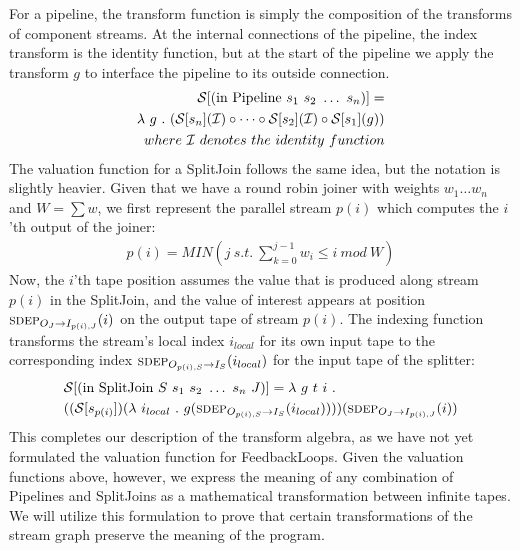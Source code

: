 For a pipeline, the transform function is simply the composition of the
transforms of component streams.  At the internal connections of the
pipeline, the index transform is the identity function, but at the start
of the pipeline we apply the transform $g$ to interface the pipeline to
its outside connection.
\begin{align*}
{\cal S} [(\mbox{in~Pipeline}~s_1~s_2~\dots~s_n)] = \\
\la~g~.~({\cal S}[s_n]({\cal I}) \circ \dots \circ {\cal S}[s_2]({\cal I}) \circ {\cal S}[s_1](g)) \\
where~{\cal I}~denotes~the~identity~function
\end{align*}
The valuation function for a SplitJoin follows the same idea, but the
notation is slightly heavier.  Given that we have a round robin joiner
with weights $w_1 \dots w_n$ and $W = \sum{w}$, we first represent the
parallel stream $p(i)$ which computes the $i$'th output of the
joiner:
\begin{align}
\label{eq:p}
p(i) = MIN(j~s.t.~\sum_{k=0}^{j-1}{w_i} \le i~mod~W)
\end{align}
Now, the $i$'th tape position assumes the value that is produced along
stream $p(i)$ in the SplitJoin, and the value of interest appears at
position $\mi{I_{p(i),J}}{O_J}(i)$ on the output tape of stream $p(i)$.
The indexing function transforms the stream's local index $i_{local}$
for its own input tape to the corresponding index
$\mi{I_S}{O_{p(i),S}}(i_{local})$ for the input tape of the splitter:
\begin{align*}
&{\cal S} [(\mbox{in~SplitJoin}~S~s_1~s_2~\dots~s_n~J)] = \la~g~t~i~.~ \\
&(({\cal S}[s_{p(i)}])(\la~i_{local}~.~g(\mi{I_S}{O_{p(i),S}}(i_{local}))))(\mi{I_{p(i),J}}{O_J}(i))
\end{align*}
This completes our description of the transform algebra, as we have
not yet formulated the valuation function for FeedbackLoops.  Given
the valuation functions above, however, we express the meaning of any
combination of Pipelines and SplitJoins as a mathematical
transformation between infinite tapes.  We will utilize this
formulation to prove that certain transformations of the stream graph
preserve the meaning of the program.

